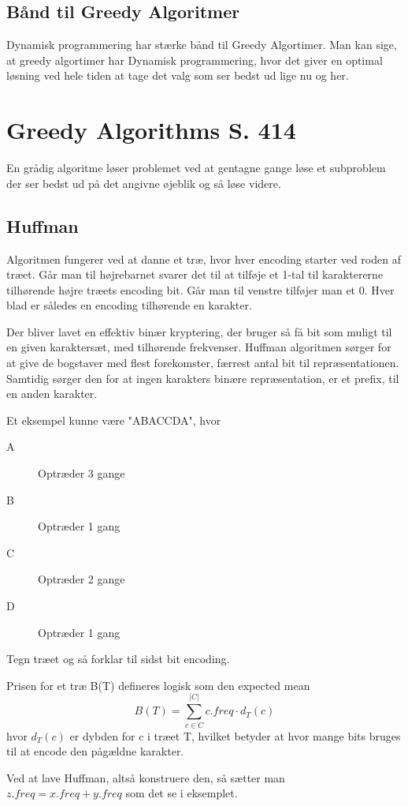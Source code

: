 \documentclass[11pt,a4paper]{report}
\theoremstyle{plain}
\theoremstyle{definition}
\theoremstyle{remark}
\numberwithin{equation}{section}
\begin{document}
\section{Bånd til Greedy Algoritmer}
Dynamisk programmering har stærke bånd til Greedy Algortimer. Man kan sige, at greedy algortimer har Dynamisk programmering, hvor det giver en optimal løsning ved hele tiden at tage det valg som ser bedst ud lige nu og her.


\chapter{Greedy Algorithms S. 414}
En grådig algoritme løser problemet ved at gentagne gange løse et subproblem der ser bedst ud på det angivne øjeblik og så løse videre.

\section{Huffman}
Algoritmen fungerer ved at danne et træ, hvor hver encoding starter ved roden af træet. Går man til højrebarnet svarer det til at tilføje et 1-tal til karaktererne tilhørende højre træets encoding bit. Går man til venstre tilføjer man et 0. Hver blad er således en encoding tilhørende en karakter.

Der bliver lavet en effektiv binær kryptering, der bruger så få bit som muligt til en given karaktersæt, med tilhørende frekvenser. Huffman algoritmen sørger for at give de bogstaver med flest forekomster, færrest antal bit til repræsentationen. Samtidig sørger den for at ingen karakters binære repræsentation, er et prefix, til en anden karakter.

Et eksempel kunne være "ABACCDA", hvor
\begin{description}
  \item[A] Optræder 3 gange
  \item[B] Optræder 1 gang
  \item[C] Optræder 2 gange
  \item[D] Optræder 1 gang
\end{description}
Tegn træet og så forklar til sidst bit encoding.

Prisen for et træ B(T) defineres logisk som den expected mean
\[
B(T) = \sum_{c\in C}^{|C|} c.freq \cdot d_T(c)
\]
hvor $d_T (c)$ er dybden for c i træet T, hvilket betyder at hvor mange bits bruges til at encode den pågældne karakter.

Ved at lave Huffman, altså konstruere den, så sætter man $z.freq = x.freq + y.freq$ som det se i eksemplet.
\end{document}
